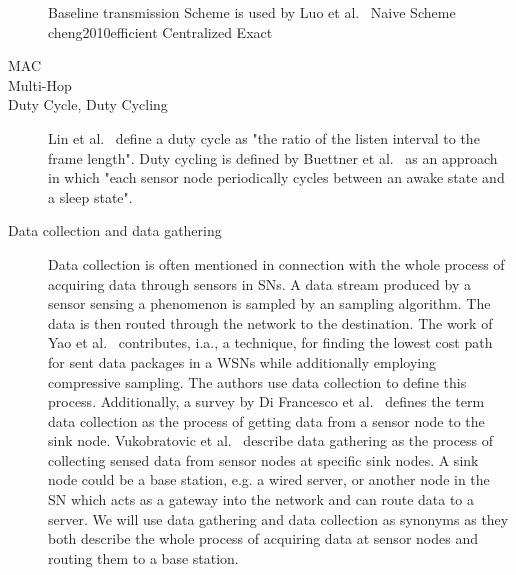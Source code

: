 \begin{description}
       
       Baseline transmission
       Scheme is used by Luo et al.~\cite{luo2009compressive} Naive Scheme
       cheng2010efficient Centralized Exact 

    \item[\ac{MAC}]
        

    \item[Multi-Hop]
       

    \item[Duty Cycle, Duty Cycling]
        Lin et al.~\cite{lin2004medium} define a duty cycle as "the ratio of
        the listen interval to the frame length". Duty cycling is defined by
        Buettner et al.~\cite{buettner2006x} as an approach in which "each
        sensor node periodically cycles between an awake state and a sleep
        state".


    \item[Data collection and data gathering] 
        Data collection is often mentioned in connection with the whole process
        of acquiring data through sensors in \acp{SN}. A data stream produced
        by a sensor sensing a phenomenon is sampled by an sampling algorithm.
        The data is then routed through the network to the destination. The
        work of Yao et al.~\cite{yao2015edal} contributes, i.a., a technique,
        for finding the lowest cost path for sent data packages in a \acp{WSN}
        while additionally employing compressive sampling. The authors use data
        collection to define this process. Additionally, a survey by Di
        Francesco et al.~\cite{di2011data} defines the term data collection as
        the process of getting data from a sensor node to the sink node.
        Vukobratovic et al.~\cite{vukobratovic2010rateless} describe data
        gathering as the process of collecting sensed data from sensor nodes at
        specific sink nodes. A sink node could be a base station, e.g. a wired
        server, or another node in the \ac{SN} which acts as a gateway into the
        network and can route data to a server. We will use data gathering and
        data collection as synonyms as they both describe the whole process of
        acquiring data at sensor nodes and routing them to a base station.


\end{description}
